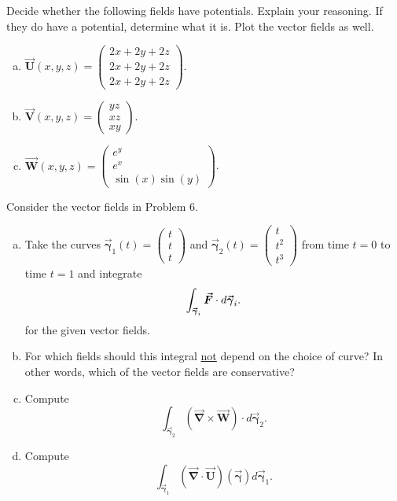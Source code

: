 \documentclass[12pt]{article} %
\newcommand{\vecfieldV}{\boldsymbol{\vec{V}}}
\newcommand{\vecfieldW}{\boldsymbol{\vec{W}}}
\newcommand{\vecfieldU}{\boldsymbol{\vec{U}}}
\newcommand{\curvegamma}{\boldsymbol{\vec{\gamma}}}
\newcommand{\grad}{\boldsymbol{\vec{\nabla}}}
\begin{document}
\begin{problem}
    Decide whether the following fields have potentials.  Explain your reasoning. If they do have a potential, determine what it is. Plot the vector fields as well.
    \begin{enumerate}[(a)]
        \item $\vecfieldU(x,y,z) = \begin{pmatrix} 2x + 2y + 2z \\ 2x + 2y + 2z \\ 2x + 2y + 2z \end{pmatrix}$.
        \item $\vecfieldV(x,y,z) = \begin{pmatrix} yz \\ xz \\ xy \end{pmatrix}$.
        \item $\vecfieldW(x,y,z) = \begin{pmatrix} e^y \\ e^x \\ \sin(x)\sin(y) \end{pmatrix}$.
    \end{enumerate}
\end{problem}

\begin{problem}
    Consider the vector fields in Problem 6. 
\begin{enumerate}[(a)]
    \item Take the curves $\curvegamma_1(t) =\begin{pmatrix} t \\ t \\ t\end{pmatrix}$ and $\curvegamma_2(t)=\begin{pmatrix} t \\ t^2 \\ t^3 \end{pmatrix}$ from time $t=0$ to time $t=1$ and integrate
    \[
    \int_{\curvegamma_i} \forcevec \cdot d\curvegamma_i.
    \]
    for the given vector fields.

    \item For which fields should this integral \underline{not} depend on the choice of curve? In other words, which of the vector fields are conservative?
    \item Compute
    \[
    \int_{\curvegamma_2} (\grad \times \vecfieldW) \cdot d\curvegamma_2.
    \]
    \item Compute
    \[
    \int_{\curvegamma_1} (\grad \cdot \vecfieldU)(\curvegamma) d\curvegamma_1.
    \]
\end{enumerate}
\end{problem}
\end{document}
